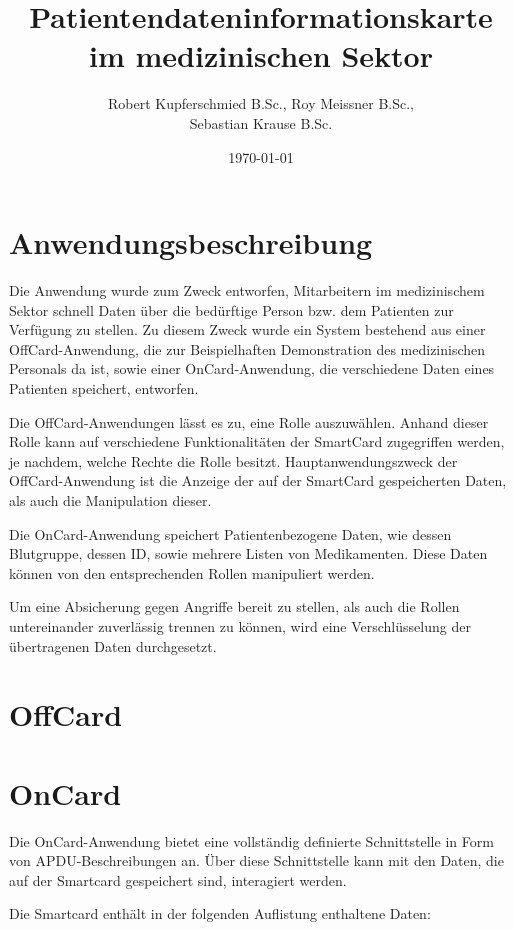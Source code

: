 \documentclass[parskip]{scrartcl}
\begin{document}
\subject{Projektdokumentation im Modul Smartcard}
\title{Patientendateninformationskarte im medizinischen Sektor}
\author{Robert Kupferschmied B.Sc., Roy Meissner B.Sc.,\\Sebastian Krause B.Sc.}
\date{\today}

\maketitle
\onehalfspacing
\section{Anwendungsbeschreibung}
	Die Anwendung wurde zum Zweck entworfen, Mitarbeitern im medizinischem Sektor schnell Daten über die bedürftige Person bzw. dem Patienten zur Verfügung zu stellen. Zu diesem Zweck wurde ein System bestehend aus einer OffCard-Anwendung, die zur Beispielhaften Demonstration des medizinischen Personals da ist, sowie einer OnCard-Anwendung, die verschiedene Daten eines Patienten speichert, entworfen.
	
	Die OffCard-Anwendungen lässt es zu, eine Rolle auszuwählen. Anhand dieser Rolle kann auf verschiedene Funktionalitäten der SmartCard zugegriffen werden, je nachdem, welche Rechte die Rolle besitzt. Hauptanwendungszweck der OffCard-Anwendung ist die Anzeige der auf der SmartCard gespeicherten Daten, als auch die Manipulation dieser.
	
	Die OnCard-Anwendung speichert Patientenbezogene Daten, wie dessen Blutgruppe, dessen ID, sowie mehrere Listen von Medikamenten. Diese Daten können von den entsprechenden Rollen manipuliert werden.
	
	Um eine Absicherung gegen Angriffe bereit zu stellen, als auch die Rollen untereinander zuverlässig trennen zu können, wird eine Verschlüsselung der übertragenen Daten durchgesetzt.
\section{OffCard}
\section{OnCard}
	Die OnCard-Anwendung bietet eine vollständig definierte Schnittstelle in Form von APDU-Beschreibungen an. Über diese Schnittstelle kann mit den Daten, die auf der Smartcard gespeichert sind, interagiert werden.
	
	Die Smartcard enthält in der folgenden Auflistung enthaltene Daten:
	
\end{document}
